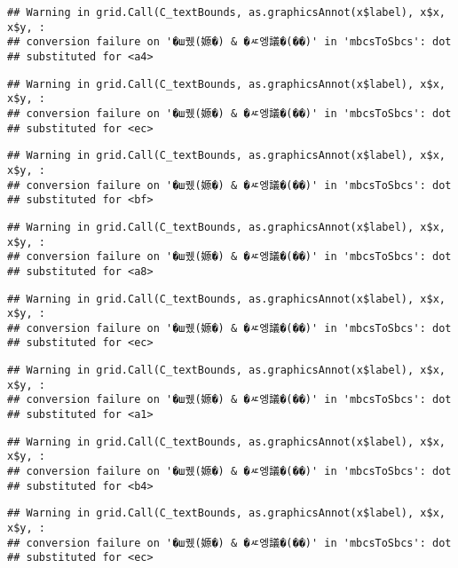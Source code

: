 \documentclass[
]{article}
\begin{document}
\begin{verbatim}
## Warning in grid.Call(C_textBounds, as.graphicsAnnot(x$label), x$x, x$y, :
## conversion failure on '�ш퀬(嫄�) & �ㅼ엥議�(��)' in 'mbcsToSbcs': dot
## substituted for <a4>
\end{verbatim}

\begin{verbatim}
## Warning in grid.Call(C_textBounds, as.graphicsAnnot(x$label), x$x, x$y, :
## conversion failure on '�ш퀬(嫄�) & �ㅼ엥議�(��)' in 'mbcsToSbcs': dot
## substituted for <ec>
\end{verbatim}

\begin{verbatim}
## Warning in grid.Call(C_textBounds, as.graphicsAnnot(x$label), x$x, x$y, :
## conversion failure on '�ш퀬(嫄�) & �ㅼ엥議�(��)' in 'mbcsToSbcs': dot
## substituted for <bf>
\end{verbatim}

\begin{verbatim}
## Warning in grid.Call(C_textBounds, as.graphicsAnnot(x$label), x$x, x$y, :
## conversion failure on '�ш퀬(嫄�) & �ㅼ엥議�(��)' in 'mbcsToSbcs': dot
## substituted for <a8>
\end{verbatim}

\begin{verbatim}
## Warning in grid.Call(C_textBounds, as.graphicsAnnot(x$label), x$x, x$y, :
## conversion failure on '�ш퀬(嫄�) & �ㅼ엥議�(��)' in 'mbcsToSbcs': dot
## substituted for <ec>
\end{verbatim}

\begin{verbatim}
## Warning in grid.Call(C_textBounds, as.graphicsAnnot(x$label), x$x, x$y, :
## conversion failure on '�ш퀬(嫄�) & �ㅼ엥議�(��)' in 'mbcsToSbcs': dot
## substituted for <a1>
\end{verbatim}

\begin{verbatim}
## Warning in grid.Call(C_textBounds, as.graphicsAnnot(x$label), x$x, x$y, :
## conversion failure on '�ш퀬(嫄�) & �ㅼ엥議�(��)' in 'mbcsToSbcs': dot
## substituted for <b4>
\end{verbatim}

\begin{verbatim}
## Warning in grid.Call(C_textBounds, as.graphicsAnnot(x$label), x$x, x$y, :
## conversion failure on '�ш퀬(嫄�) & �ㅼ엥議�(��)' in 'mbcsToSbcs': dot
## substituted for <ec>
\end{verbatim}
\end{document}

